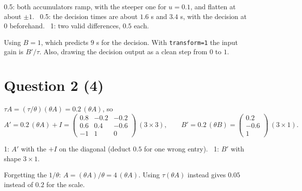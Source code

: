 \documentclass[11pt,letterpaper]{article}
\newcommand{\ans}[1]{\par\vspace{4pt}{\bfseries #1}\quad}
\begin{document}
\begin{marking}
0.5: both accumulators ramp, with the steeper one for $u = 0.1$, and flatten at about $\pm1$. \ 0.5: the decision times are about $1.6$ s and $3.4$ s, with the decision at $0$ beforehand. \ 1: two valid differences, $0.5$ each.
\end{marking}
\begin{trap}
Using $B = 1$, which predicts $9$ s for the decision. With \texttt{transform=1} the input gain is $B'/\tau$. Also, drawing the decision output as a clean step from $0$ to $1$.
\end{trap}

\section*{Question 2 \hfill (4)}

\ans{(a) [2]}
$\tau A = (\tau/\theta)(\theta A) = 0.2\,(\theta A)$, so
\[
A' = 0.2\,(\theta A) + I = \begin{pmatrix} 0.8 & -0.2 & -0.2 \\ 0.6 & 0.4 & -0.6 \\ -1 & 1 & 0 \end{pmatrix}\ (3 \times 3), \qquad
B' = 0.2\,(\theta B) = \begin{pmatrix} 0.2 \\ -0.6 \\ 1 \end{pmatrix}\ (3 \times 1).
\]
\begin{marking}
1: $A'$ with the $+I$ on the diagonal (deduct $0.5$ for one wrong entry). \ 1: $B'$ with shape $3 \times 1$.
\end{marking}
\begin{trap}
Forgetting the $1/\theta$: $A = (\theta A)/\theta = 4\,(\theta A)$. Using $\tau(\theta A)$ instead gives $0.05$ instead of $0.2$ for the scale.
\end{trap}
\end{document}
